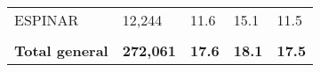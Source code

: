 \begin{tabular}{lllll}
	\cellcolor[HTML]{FF5050}ESPINAR                                & 12,244                                                                & 11.6                                                                             & 15.1                                                                        & 11.5                                                                                \\
	&                                                                       &                                                                                  &                                                                             &                                                                                     \\
	\rowcolor[HTML]{DDEBF7} 
	\textbf{Total   general}                                       & \textbf{272,061}                                                      & \textbf{17.6}                                                                    & \textbf{18.1}                                                               & \textbf{17.5}                                                                      
\end{tabular}